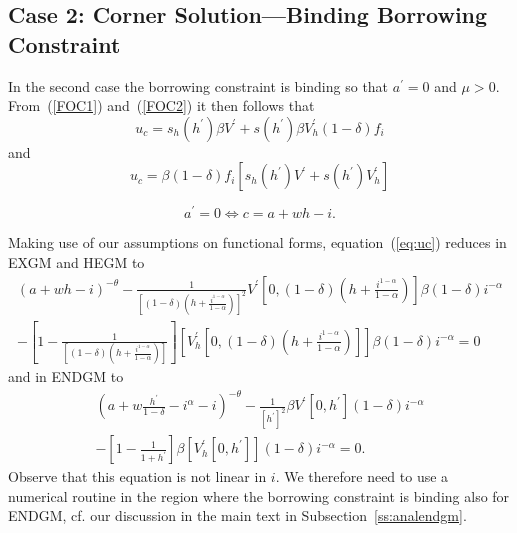 \documentclass[a4paper,12pt]{article}
\begin{document}
\subsection*{Case 2: Corner Solution---Binding Borrowing Constraint}

In the second case the borrowing constraint is binding so that $a^{\prime}=0$ and $\mu>0$. From~(\ref{FOC1}) and~(\ref{FOC2}) it then follows that
\begin{equation}
	u_{c} = s_{h}\left(h^{\prime}\right) \beta V^{\prime} + s\left(h^{\prime}\right) \beta V_{h}^{\prime} \left(1-\delta\right) f_{i}  \label{eq:uc}
\end{equation}
and
\[
	u_{c} = \beta \left(1 - \delta\right) f_{i} \left[s_{h} \left(h^{\prime}\right) V^{\prime} + s\left(h^{\prime}\right) V_{h}^{\prime}\right]
\]

\[
	a^{\prime} = 0 \Leftrightarrow c=a+wh-i.
\]

Making use of our assumptions on functional forms, equation~(\ref{eq:uc}) reduces in EXGM and HEGM to
\begin{multline*}
	\left(a + w h - i\right)^{-\theta} - \frac{1} {\left[\left(1 - \delta\right)\left(h + \frac{i^{1 - \alpha}} {1 - \alpha}\right)\right]^{2}} V^{\prime}\left[0,\left(1 - \delta\right) \left(h + \frac{i^{1 - \alpha}}{1 - \alpha}\right)\right] \beta \left(1 - \delta\right) i^{-\alpha}  \\
	-\left[1 - \frac{1} {\left[\left(1 - \delta\right)\left(h + \frac{i^{1 - \alpha}}{1 - \alpha}\right)\right]}\right] \left[V_{h}^{\prime}\left[0,\left(1 - \delta\right) \left(h + \frac{i^{1 - \alpha}}{1 - \alpha}\right)\right]\right] \beta \left(1 - \delta\right) i^{-\alpha} = 0 
\end{multline*}
and in ENDGM to
\begin{multline*}
	\left(a + w \frac{h^{\prime}} {1 - \delta} - i^{\alpha} - i\right)^{-\theta} - \frac{1} {\left[h^{\prime}\right]^{2}} \beta V^{\prime}\left[0,h^{\prime}\right] \left(1 - \delta\right) i^{-\alpha}  \\
	-\left[1 - \frac{1} {1 + h^{\prime}}\right] \beta \left[V_{h}^{\prime}\left[0,h^{\prime}\right]\right] \left(1 - \delta\right) i^{-\alpha} = 0.
\end{multline*}
Observe that this equation is not linear in $i$. We therefore need to use a numerical routine in the region where the borrowing constraint is binding also for ENDGM, cf. our discussion in the main text in Subsection~\ref{ss:analendgm}.

\qquad
\end{document}
